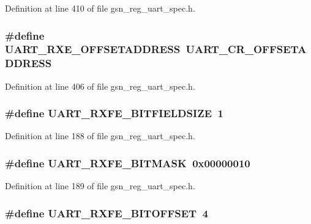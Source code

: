 Definition at line 410 of file gsn\_\-reg\_\-uart\_\-spec.h.

\hypertarget{a00575_a008458da9c941f0c42d57118f9bd1162}{
\subsubsection[{UART\_\-RXE\_\-OFFSETADDRESS}]{\setlength{\rightskip}{0pt plus 5cm}\#define UART\_\-RXE\_\-OFFSETADDRESS~UART\_\-CR\_\-OFFSETADDRESS}}
\label{a00575_a008458da9c941f0c42d57118f9bd1162}


Definition at line 406 of file gsn\_\-reg\_\-uart\_\-spec.h.

\hypertarget{a00575_aff918a769f7010e187149aa09682df84}{
\subsubsection[{UART\_\-RXFE\_\-BITFIELDSIZE}]{\setlength{\rightskip}{0pt plus 5cm}\#define UART\_\-RXFE\_\-BITFIELDSIZE~1}}
\label{a00575_aff918a769f7010e187149aa09682df84}


Definition at line 188 of file gsn\_\-reg\_\-uart\_\-spec.h.

\hypertarget{a00575_afb19501bb45aec652e78c1b8ef80819b}{
\subsubsection[{UART\_\-RXFE\_\-BITMASK}]{\setlength{\rightskip}{0pt plus 5cm}\#define UART\_\-RXFE\_\-BITMASK~0x00000010}}
\label{a00575_afb19501bb45aec652e78c1b8ef80819b}


Definition at line 189 of file gsn\_\-reg\_\-uart\_\-spec.h.

\hypertarget{a00575_a28bb0df169b29bb34e1cf3ed853a219a}{
\subsubsection[{UART\_\-RXFE\_\-BITOFFSET}]{\setlength{\rightskip}{0pt plus 5cm}\#define UART\_\-RXFE\_\-BITOFFSET~4}}
\label{a00575_a28bb0df169b29bb34e1cf3ed853a219a}


